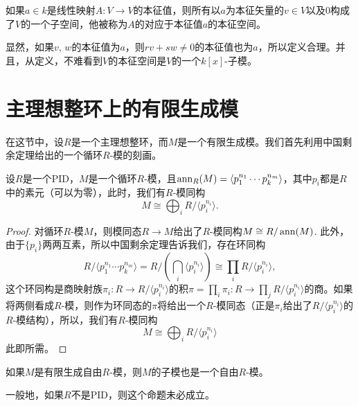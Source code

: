 \begin{para}[本征空间]
    如果$a\in k$是线性映射$A:V\to V$的本征值，则所有以$a$为本征矢量的$v\in V$以及$0$构成了$V$的一个子空间，他被称为$A$的对应于本征值$a$的本征空间。

    显然，如果$v$, $w$的本征值为$a$，则$rv+sw\neq 0$的本征值也为$a$，所以定义合理。并且，从定义，不难看到$V$的本征空间是$V$的一个$k[x]$-子模。
\end{para}

\section{主理想整环上的有限生成模}

在这节中，设$R$是一个主理想整环，而$M$是一个有限生成模。我们首先利用中国剩余定理给出的一个循环$R$-模的刻画。

\begin{pro}
    设$R$是一个PID，$M$是一个循环$R$-模，且$\operatorname{ann}_R(M)=\langle p_1^{n_1}\cdots p_k^{n_m}\rangle$，其中$p_i$都是$R$中的素元（可以为零），此时，我们有$R$-模同构
    \[
        M\cong \bigoplus_i R/\langle p_i^{n_i}\rangle.
    \]
\end{pro}

\begin{proof}
    对循环$R$-模$M$，则模同态$R\to M$给出了$R$-模同构$M\cong R/\operatorname{ann}(M)$. 此外，由于$\{p_i\}$两两互素，所以中国剩余定理告诉我们，存在环同构
    \[
        R/\langle p_1^{n_1}\cdots p_k^{n_m}\rangle = R/\left(\bigcap_i \langle p_i^{n_i}\rangle\right)\cong \prod_i R/\langle p_i^{n_i}\rangle,
    \]
    这个环同构是商映射族$\pi_i:R\to R/\langle p_i^{n_i}\rangle$的积$\pi=\prod_i \pi_i:R\to \prod_j R/\langle p_i^{n_i}\rangle$的商。如果将两侧看成$R$-模，则作为环同态的$\pi$将给出一个$R$-模同态（正是$\pi_i$给出了$R/\langle p_i^{n_i}\rangle$的$R$-模结构），所以，我们有$R$-模同构
    \[
        M\cong \bigoplus_i R/\langle p_i^{n_i}\rangle
    \]
    此即所需。
\end{proof}

\begin{pro}
	如果$M$是有限生成自由$R$-模，则$M$的子模也是一个自由$R$-模。
\end{pro}

一般地，如果$R$不是PID，则这个命题未必成立。

